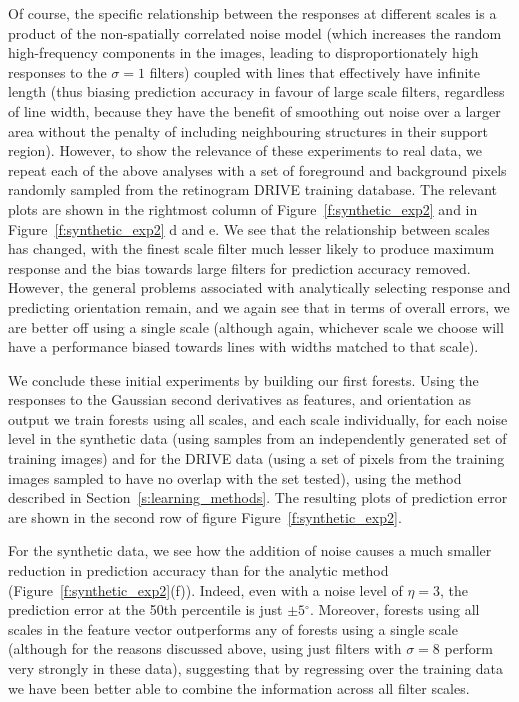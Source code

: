 \documentclass{IEEEtran}
\newcommand{\fref}[1]{Figure~\ref{#1}}
\newcommand{\sref}[1]{Section~\ref{#1}}
\def\deg{\ensuremath{^\circ}}
\begin{document}
Of course, the specific relationship between the responses at different scales is a product of the non-spatially correlated noise model (which increases the random high-frequency components in the images, leading to disproportionately  high responses to the $\sigma = 1$ filters) coupled with lines that effectively have infinite length (thus biasing prediction accuracy in favour of large scale filters, regardless of line width, because they have the benefit of smoothing out noise over a larger area without the penalty of including neighbouring structures in their support region). However, to show the relevance of these experiments to real data, we repeat each of the above analyses with a set of foreground and background pixels randomly sampled from the retinogram DRIVE training database. The relevant plots are shown in the rightmost column of \fref{f:synthetic_exp2} and in \fref{f:synthetic_exp2} d and e. We see that the relationship between scales has changed, with the finest scale filter much lesser likely to produce maximum response and the bias towards large filters for prediction accuracy removed. However, the general problems associated with analytically selecting response and predicting orientation remain, and we again see that in terms of overall errors, we are better off using a single scale (although again, whichever scale we choose will have a performance biased towards lines with widths matched to that scale).

We conclude these initial experiments by building our first forests. Using the responses to the Gaussian second derivatives as features, and orientation as output we train forests using all scales, and each scale individually, for each noise level in the synthetic data (using samples from an independently generated set of training images) and for the DRIVE data (using a set of pixels from the training images sampled to have no overlap with the set tested), using the method described in \sref{s:learning_methods}. The resulting plots of prediction error are shown in the second row of figure \fref{f:synthetic_exp2}.

For the synthetic data, we see how the addition of noise causes a much smaller reduction in prediction accuracy than for the analytic method (\fref{f:synthetic_exp2}(f)). Indeed, even with a noise level of $\eta = 3$, the prediction error at the 50th percentile is just $\pm5\deg$. Moreover, forests using all scales in the feature vector outperforms any of forests using a single scale (although for the reasons discussed above, using just filters with $\sigma=8$ perform very strongly in these data), suggesting that by regressing over the training data we have been better able to combine the information across all filter scales.
\end{document}
